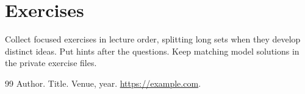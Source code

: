 \documentclass[11pt,twoside]{article}
\theoremstyle{definition}
\theoremstyle{remark}
\begin{document}
\section{Exercises}
\label{sec:exercises}

Collect focused exercises in lecture order, splitting long sets when they
develop distinct ideas. Put hints after the questions. Keep matching model
solutions in the private exercise files.

% 


\clearpage
\begin{thebibliography}{99}
Author.
\newblock Title.
\newblock Venue, year.
\newblock \url{https://example.com}.
\end{thebibliography}
\end{document}
